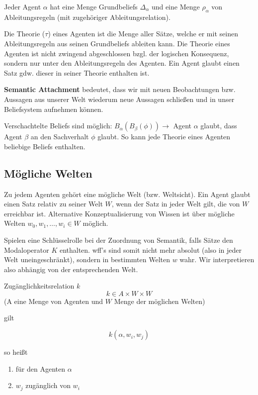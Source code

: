 \documentclass[runningheads,deutsch]{llncs}
\begin{document}
Jeder Agent $\alpha$ hat eine Menge Grundbeliefs $\Delta_{\alpha}$ und eine Menge $\rho_{\alpha}$ von Ableitungsregeln (mit zugehöriger Ableitungsrelation).

Die Theorie ($\tau$) eines Agenten ist die Menge aller Sätze, welche er mit seinen Ableitungsregeln aus seinen Grundbeliefs ableiten kann. Die Theorie eines Agenten ist nicht zwingend abgeschlossen bzgl. der logischen Konsequenz, sondern nur unter den Ableitungsregeln des Agenten. Ein Agent glaubt einen Satz gdw. dieser in seiner Theorie enthalten ist.

\textbf{Semantic Attachment} bedeutet, dass wir mit neuen Beobachtungen bzw. Aussagen aus unserer Welt wiederum neue Aussagen schließen und in unser Beliefsystem aufnehmen können.

Verschachtelte Beliefs sind möglich: $B_{\alpha}(B_{\beta}(\phi)) \rightarrow$ Agent $\alpha$ glaubt, dass Agent $\beta$ an den Sachverhalt $\phi$ glaubt. So kann jede Theorie eines Agenten beliebige Beliefs enthalten.

\subsection{Mögliche Welten}
Zu jedem Agenten gehört eine mögliche Welt (bzw. Weltsicht). Ein Agent glaubt einen Satz relativ zu seiner Welt $W$, wenn der Satz in jeder Welt gilt, die von $W$ erreichbar ist. Alternative Konzeptualisierung von Wissen ist über mögliche Welten $w_0, w_1, \ldots, w_i \in W$ möglich.

Spielen eine Schlüsselrolle bei der Zuordnung von Semantik, falls Sätze den Modaloperator $K$ enthalten. wff's sind somit nicht mehr absolut (also in jeder Welt uneingeschränkt), sondern in bestimmten Welten $w$ wahr. Wir interpretieren also abhängig von der entsprechenden Welt.

\begin{definition}Zugänglichkeitsrelation $k$
    \[ k \in A \times W \times W \]
    (A eine Menge von Agenten und $W$ Menge der möglichen Welten)
    
    gilt

    \[ k(\alpha, w_i, w_j) \]

    so heißt

    \begin{enumerate}
        \item für den Agenten $\alpha$
        \item $w_j$ zugänglich von $w_i$
    \end{enumerate}
\end{definition}
\end{document}
